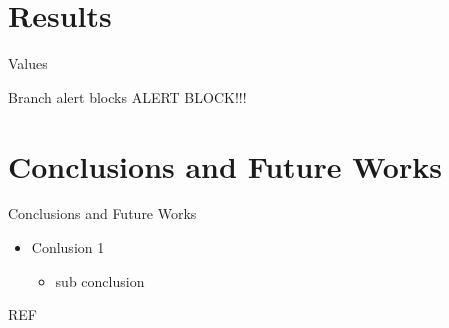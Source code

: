 \documentclass{beamer}
\begin{document}
	\section{Results}
	
	\begin{frame}{Values}
	\begin{alertblock}{Branch alert blocks}
ALERT BLOCK!!!
	\end{alertblock}
\end{frame}
	\section{Conclusions and Future Works}
	
	\begin{frame}{Conclusions and Future Works}
\begin{itemize}
	\item Conlusion 1
	\begin{itemize}
		\item sub conclusion
	\end{itemize}
\end{itemize}
\end{frame}

\begin{frame}{REF}
%
%
\printbibliography
\end{frame}
\end{document}
